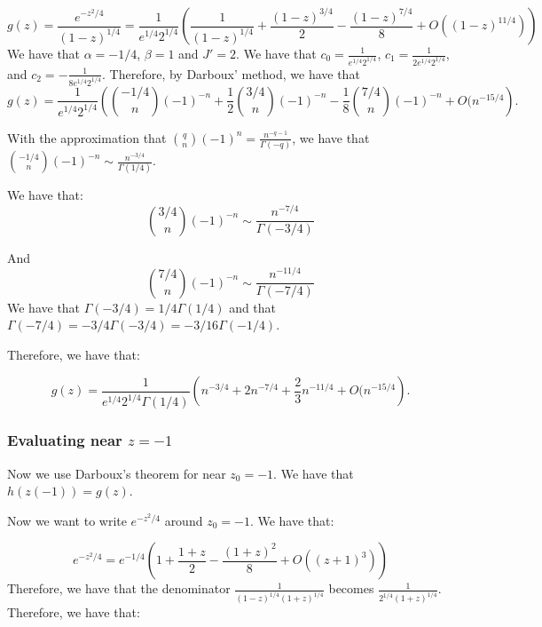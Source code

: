 \documentclass[]{article}
\begin{document}
\begin{equation}
	g(z) = \frac{e^{-z^2/4}}{(1 - z)^{1/4}} = \frac{1}{e^{1/4} 2^{1/4}} \left(\frac{1}{(1 - z)^{1/4}} + \frac{(1 - z)^{3/4}}{2} - \frac{(1 - z)^{7/4}}{8} +  O((1 - z)^{11/4})\right)
\end{equation}
We have that $\alpha = -1/4$, $\beta = 1$ and $J' = 2$. We have that $c_0 = \frac{1}{e^{1/4} 2^{1/4}}$, $c_1 = \frac{1}{2 e^{1/4} 2^{1/4}}$, and $c_2 = -\frac{1}{8 e^{1/4} 2^{1/4}}$.
Therefore, by Darboux' method, we have that 
\begin{equation}
	[z^n]g(z) = \frac{1}{e^{1/4} 2^{1/4}} \left( \binom{-1/4}{n}(-1)^{-n} +  \frac{1}{2}\binom{3/4}{n}(-1)^{-n} - \frac{1}{8} \binom{7/4}{n} (-1)^{-n} + O(n^{-15/4} \right).
\end{equation}

With the approximation that $\binom{q}{n}(-1)^n = \frac{n^{-q - 1}}{\Gamma(-q)}$, we have that $\binom{-1/4}{n}(-1)^{-n} \sim \frac{n^{-3/4}}{\Gamma(1/4)}$.

We have that:
\begin{equation}
	\binom{3/4}{n}(-1)^{-n} \sim \frac{n^{-7/4}}{\Gamma(-3/4)}
\end{equation}

And
\begin{equation}
	\binom{7/4}{n}(-1)^{-n} \sim \frac{n^{-11/4}}{\Gamma(-7/4)}
\end{equation}
We have that $\Gamma(-3/4) = 1/4 \Gamma(1/4)$ and that $\Gamma(-7/4) = -3/4 \Gamma(-3/4) = -3/16 \Gamma(-1/4)$. 

Therefore, we have that:

\begin{equation}
	[z^n]g(z) = \frac{1}{e^{1/4} 2^{1/4}\Gamma(1/4)} \left( n^{-3/4} +  2 n^{-7/4} + \frac{2}{3} n^{-11/4} + O(n^{-15/4} \right).
\end{equation}

\subsubsection{Evaluating near $z = -1$}
Now we use Darboux's theorem for near $z_0 = -1$. We have that $h(z(-1)) = g(z)$. 

Now we want to write $e^{-z^2/4}$ around $z_0 = -1$. We have that:

\begin{equation}
	e^{-z^2/4} = e^{-1/4} \left(1 + \frac{1 + z}{2} - \frac{(1 + z)^2}{8} + O((z + 1)^3)\right)
\end{equation}
Therefore, we have that the denominator $\frac{1}{(1 - z)^{1/4} (1 + z)^{1/4}}$ becomes $\frac{1}{2^{1/4}(1 + z)^{1/4}}$. Therefore, we have that:
\end{document}
